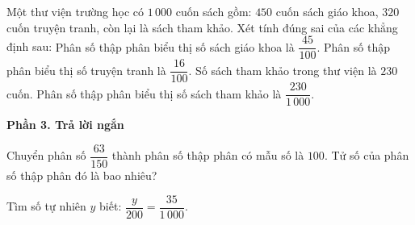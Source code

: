 \begin{ex} %
Một thư viện trường học có $1\,000$ cuốn sách gồm: $450$ cuốn sách giáo khoa, $320$ cuốn truyện tranh, còn lại là sách tham khảo. Xét tính đúng sai của các khẳng định sau:
\choiceTF
{\True Phân số thập phân biểu thị số sách giáo khoa là $\dfrac{45}{100}$.}
{Phân số thập phân biểu thị số truyện tranh là $\dfrac{16}{100}$.}
{\True Số sách tham khảo trong thư viện là $230$ cuốn.}
{\True Phân số thập phân biểu thị số sách tham khảo là $\dfrac{230}{1\,000}$.}
\end{ex}

\textbf{Phần 3. Trả lời ngắn}

\begin{ex} %
Chuyển phân số $\dfrac{63}{150}$ thành phân số thập phân có mẫu số là $100$. Tử số của phân số thập phân đó là bao nhiêu?
\end{ex}

\begin{ex} %
Tìm số tự nhiên $y$ biết: $\dfrac{y}{200} = \dfrac{35}{1\,000}$.
\end{ex}

